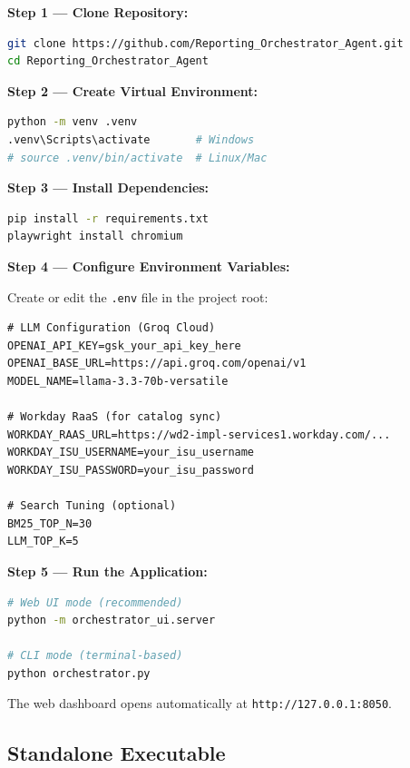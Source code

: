 \documentclass[12pt,a4paper]{article}
\begin{document}
\textbf{Step 1 --- Clone Repository:}
\begin{lstlisting}[language=bash, caption={Clone and Enter Project}, label={lst:clone}]
git clone https://github.com/Reporting_Orchestrator_Agent.git
cd Reporting_Orchestrator_Agent
\end{lstlisting}

\textbf{Step 2 --- Create Virtual Environment:}
\begin{lstlisting}[language=bash, caption={Python Environment Setup}, label={lst:venv}]
python -m venv .venv
.venv\Scripts\activate       # Windows
# source .venv/bin/activate  # Linux/Mac
\end{lstlisting}

\textbf{Step 3 --- Install Dependencies:}
\begin{lstlisting}[language=bash, caption={Install All Dependencies}, label={lst:pip-install}]
pip install -r requirements.txt
playwright install chromium
\end{lstlisting}

\textbf{Step 4 --- Configure Environment Variables:}

Create or edit the \texttt{.env} file in the project root:

\begin{lstlisting}[caption={.env Configuration Template}, label={lst:env-template}]
# LLM Configuration (Groq Cloud)
OPENAI_API_KEY=gsk_your_api_key_here
OPENAI_BASE_URL=https://api.groq.com/openai/v1
MODEL_NAME=llama-3.3-70b-versatile

# Workday RaaS (for catalog sync)
WORKDAY_RAAS_URL=https://wd2-impl-services1.workday.com/...
WORKDAY_ISU_USERNAME=your_isu_username
WORKDAY_ISU_PASSWORD=your_isu_password

# Search Tuning (optional)
BM25_TOP_N=30
LLM_TOP_K=5
\end{lstlisting}

\textbf{Step 5 --- Run the Application:}

\begin{lstlisting}[language=bash, caption={Launch the Web UI}, label={lst:run-app}]
# Web UI mode (recommended)
python -m orchestrator_ui.server

# CLI mode (terminal-based)
python orchestrator.py
\end{lstlisting}

The web dashboard opens automatically at \texttt{http://127.0.0.1:8050}.

\subsection{Standalone Executable}
\label{subsec:exe-setup}
\end{document}
